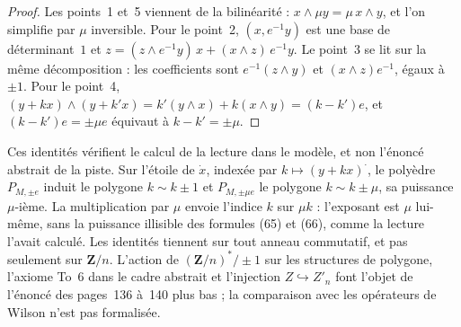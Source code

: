 \begin{proof}
Les points~1 et~5 viennent de la bilinéarité : $x \wedge \mu y = \mu\, x \wedge y$, et l'on simplifie par $\mu$ inversible. Pour le point~2, $(x, e^{-1}y)$ est une base de déterminant~$1$ et $z = (z \wedge e^{-1}y)\,x + (x \wedge z)\,e^{-1}y$. Le point~3 se lit sur la même décomposition : les coefficients sont $e^{-1}(z \wedge y)$ et $(x \wedge z)e^{-1}$, égaux à $\pm 1$. Pour le point~4, $(y + kx) \wedge (y + k'x) = k'(y \wedge x) + k(x \wedge y) = (k - k')e$, et $(k - k')e = \pm\mu e$ équivaut à $k - k' = \pm\mu$.
\end{proof}

\begin{remarque}
Ces identités vérifient le calcul de la lecture dans le modèle, et non l'énoncé abstrait de la piste. Sur l'étoile de $\dot x$, indexée par $k \mapsto (y + kx)^{\cdot}$, le polyèdre $P_{M, \pm e}$ induit le polygone $k \sim k \pm 1$ et $P_{M, \pm\mu e}$ le polygone $k \sim k \pm \mu$, sa puissance $\mu$-ième. La multiplication par $\mu$ envoie l'indice $k$ sur $\mu k$ : l'exposant est $\mu$ lui-même, sans la puissance illisible des formules (65) et (66), comme la lecture l'avait calculé. Les identités tiennent sur tout anneau commutatif, et pas seulement sur $\mathbf Z/n$. L'action de $(\mathbf Z/n)^*/\pm 1$ sur les structures de polygone, l'axiome To~6 dans le cadre abstrait et l'injection $Z \hookrightarrow Z'_n$ font l'objet de l'énoncé des pages~136 à~140 plus bas ; la comparaison avec les opérateurs de Wilson n'est pas formalisée.
\end{remarque}


